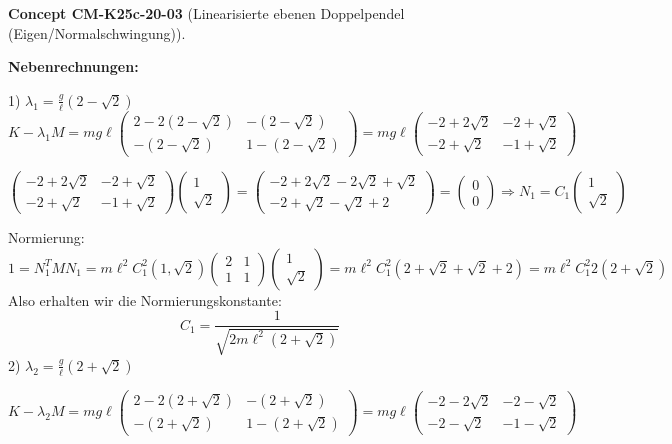 \documentclass[10pt, letterpaper]{article}
\newcommand{\CustomHeading}[3]{%
  \par\medskip\noindent%
  \textbf{#1 #2} \textnormal{(#3)}.\enskip%
}
\newenvironment{CONC}[2]{\begin{unitbox}\CustomHeading{Concept}{#1}{#2}}{\end{unitbox}}
\begin{document}
\begin{CONC}{CM-K25c-20-03}{Linearisierte ebenen Doppelpendel (Eigen/Normalschwingung)}
\noindent\textbf{Nebenrechnungen:}

1) $\lambda_1 = \frac{g}{\ell}(2-\sqrt{2})$
\[K-\lambda_1 M = mg\ell\begin{pmatrix}2-2(2-\sqrt{2}) & -(2-\sqrt{2}) \\ -(2-\sqrt{2}) & 1-(2-\sqrt{2})\end{pmatrix} = mg\ell\begin{pmatrix}-2+2\sqrt{2} & -2+\sqrt{2} \\ -2+\sqrt{2} & -1+\sqrt{2}\end{pmatrix}\]

\[\begin{pmatrix}-2+2\sqrt{2} & -2+\sqrt{2} \\ -2+\sqrt{2} & -1+\sqrt{2}\end{pmatrix}\begin{pmatrix}1 \\ \sqrt{2}\end{pmatrix} = \begin{pmatrix}-2+2\sqrt{2}-2\sqrt{2}+\sqrt{2} \\ -2+\sqrt{2}-\sqrt{2}+2\end{pmatrix} = \begin{pmatrix}0 \\ 0\end{pmatrix} \Rightarrow N_1 = C_1\begin{pmatrix}1 \\ \sqrt{2}\end{pmatrix}\]

Normierung:
\[1 = N_1^T M N_1 = m\ell^2 C_1^2(1,\sqrt{2})\begin{pmatrix}2 & 1 \\ 1 & 1\end{pmatrix}\begin{pmatrix}1 \\ \sqrt{2}\end{pmatrix} = m\ell^2 C_1^2(2+\sqrt{2}+\sqrt{2}+2) = m\ell^2 C_1^2 2(2+\sqrt{2})\]
Also erhalten wir die Normierungskonstante:
\[C_1 = \frac{1}{\sqrt{2m\ell^2(2+\sqrt{2})}}\]
2) $\lambda_2 = \frac{g}{\ell}(2+\sqrt{2})$

$K-\lambda_2 M = mg\ell\begin{pmatrix}2-2(2+\sqrt{2}) & -(2+\sqrt{2}) \\ -(2+\sqrt{2}) & 1-(2+\sqrt{2})\end{pmatrix} = mg\ell\begin{pmatrix}-2-2\sqrt{2} & -2-\sqrt{2} \\ -2-\sqrt{2} & -1-\sqrt{2}\end{pmatrix}$


\end{CONC}
\end{document}
